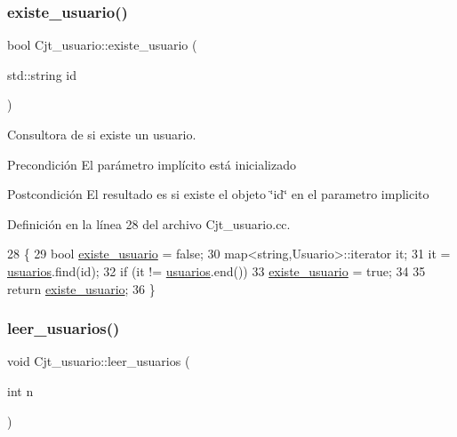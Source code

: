 \subsubsection{\texorpdfstring{existe\+\_\+usuario()}{existe\_usuario()}}
{\footnotesize\ttfamily bool Cjt\+\_\+usuario\+::existe\+\_\+usuario (\begin{DoxyParamCaption}\item[{std\+::string}]{id }\end{DoxyParamCaption})}



Consultora de si existe un usuario. 

\begin{DoxyPrecond}{Precondición}
El parámetro implícito está inicializado 
\end{DoxyPrecond}
\begin{DoxyPostcond}{Postcondición}
El resultado es si existe el objeto \char`\"{}id\char`\"{} en el parametro implicito 
\end{DoxyPostcond}


Definición en la línea 28 del archivo Cjt\+\_\+usuario.\+cc.


\begin{DoxyCode}
28                                           \{
29     \textcolor{keywordtype}{bool} \mbox{\hyperlink{class_cjt__usuario_a2d4478e6b967659040f5a0b86b665204}{existe\_usuario}} = \textcolor{keyword}{false};
30     map<string,Usuario>::iterator it;
31     it = \mbox{\hyperlink{class_cjt__usuario_af814d06f1c52bc2e744d253d20ce6e6b}{usuarios}}.find(\textcolor{keywordtype}{id});
32     \textcolor{keywordflow}{if} (it != \mbox{\hyperlink{class_cjt__usuario_af814d06f1c52bc2e744d253d20ce6e6b}{usuarios}}.end())
33         \mbox{\hyperlink{class_cjt__usuario_a2d4478e6b967659040f5a0b86b665204}{existe\_usuario}} = \textcolor{keyword}{true};
34 
35     \textcolor{keywordflow}{return} \mbox{\hyperlink{class_cjt__usuario_a2d4478e6b967659040f5a0b86b665204}{existe\_usuario}};
36 \}
\end{DoxyCode}
\mbox{\label{class_cjt__usuario_a75a98423be866287a841a77849ea3e6f}} 
\subsubsection{\texorpdfstring{leer\+\_\+usuarios()}{leer\_usuarios()}}
{\footnotesize\ttfamily void Cjt\+\_\+usuario\+::leer\+\_\+usuarios (\begin{DoxyParamCaption}\item[{int}]{n }\end{DoxyParamCaption})}



